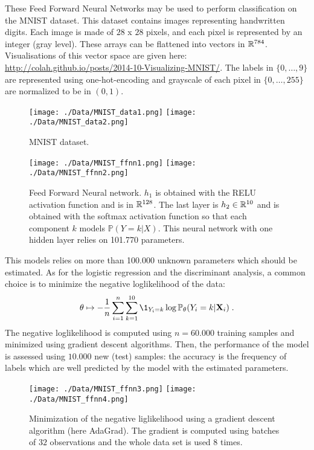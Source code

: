 These Feed Forward Neural Networks may be used to perform classification on the MNIST dataset. This dataset contains images representing handwritten digits. Each image is made of $28$ x $28$ pixels, and each pixel is represented by an integer (gray level). These arrays can be flattened into vectors in $\mathbb{R}^{784}$. Visualisations of this vector space are given here: \url{http://colah.github.io/posts/2014-10-Visualizing-MNIST/}.
The labels in $\{0,\ldots,9\}$ are represented using one-hot-encoding and grayscale of each pixel in $\{0,\ldots, 255\}$ are normalized to be in $(0,1)$.

\begin{figure}
\begin{center}
\texttt{[image: ./Data/MNIST\_data1.png]}
\texttt{[image: ./Data/MNIST\_data2.png]}
\end{center}
\caption{MNIST dataset.}
\end{figure}

\begin{figure}
\begin{center}
\texttt{[image: ./Data/MNIST\_ffnn1.png]}
\texttt{[image: ./Data/MNIST\_ffnn2.png]}
\end{center}
\caption{Feed Forward Neural network. $h_1$ is obtained with the RELU activation function and is in $\mathbb{R}^{128}$. The last layer is $h_2\in\mathbb{R}^{10}$ and is obtained with the softmax activation function so that each component $k$ models $\mathbb{P}(Y=k|X)$. This neural network with one hidden layer relies on 101.770 parameters.}
\end{figure}

This models relies on more than 100.000 unknown parameters which should be estimated. As for the logistic regression and the discriminant analysis, a common choice is to minimize the negative loglikelihood of the data:
$$
\theta \mapsto -\frac{1}{n} \sum_{i=1}^n\sum_{k=1}^{10} \1_{Y_i=k}\log \mathbb{P}_{\theta}(Y_i = k | \bX_i)\eqsp.
$$
The negative loglikelihood is computed using $n = 60.000$ training samples and minimized using gradient descent algorithms. Then, the performance of the model is assessed using $10.000$ new (test) samples: the accuracy is the frequency of labels which are well predicted by the model with the estimated parameters.

\begin{figure}
\begin{center}
\texttt{[image: ./Data/MNIST\_ffnn3.png]}
\texttt{[image: ./Data/MNIST\_ffnn4.png]}
\end{center}
\caption{Minimization of the negative liglikelihood using a gradient descent algorithm (here AdaGrad). The gradient is computed using batches of $32$ observations and the whole data set is used $8$ times.}
\end{figure}

